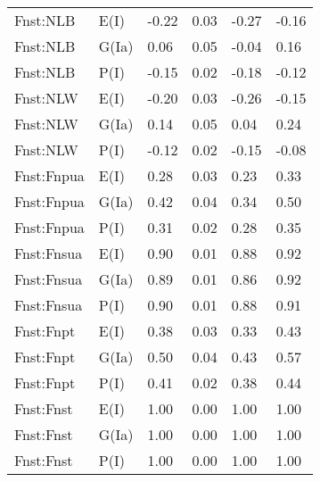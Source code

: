\begin{center}
\begin{longtable}{|p{1.1in}|p{0.7in}|p{0.7in}|p{0.6in}|p{0.6in}|p{0.6in}|}
  Fnst:NLB & E(I) & -0.22 & 0.03 & -0.27 & -0.16 \\ 
  Fnst:NLB & G(Ia) & 0.06 & 0.05 & -0.04 & 0.16 \\ 
  Fnst:NLB & P(I) & -0.15 & 0.02 & -0.18 & -0.12 \\ 
  Fnst:NLW & E(I) & -0.20 & 0.03 & -0.26 & -0.15 \\ 
  Fnst:NLW & G(Ia) & 0.14 & 0.05 & 0.04 & 0.24 \\ 
  Fnst:NLW & P(I) & -0.12 & 0.02 & -0.15 & -0.08 \\ 
  Fnst:Fnpua & E(I) & 0.28 & 0.03 & 0.23 & 0.33 \\ 
  Fnst:Fnpua & G(Ia) & 0.42 & 0.04 & 0.34 & 0.50 \\ 
  Fnst:Fnpua & P(I) & 0.31 & 0.02 & 0.28 & 0.35 \\ 
  Fnst:Fnsua & E(I) & 0.90 & 0.01 & 0.88 & 0.92 \\ 
  Fnst:Fnsua & G(Ia) & 0.89 & 0.01 & 0.86 & 0.92 \\ 
  Fnst:Fnsua & P(I) & 0.90 & 0.01 & 0.88 & 0.91 \\ 
  Fnst:Fnpt & E(I) & 0.38 & 0.03 & 0.33 & 0.43 \\ 
  Fnst:Fnpt & G(Ia) & 0.50 & 0.04 & 0.43 & 0.57 \\ 
  Fnst:Fnpt & P(I) & 0.41 & 0.02 & 0.38 & 0.44 \\ 
  Fnst:Fnst & E(I) & 1.00 & 0.00 & 1.00 & 1.00 \\ 
  Fnst:Fnst & G(Ia) & 1.00 & 0.00 & 1.00 & 1.00 \\ 
  Fnst:Fnst & P(I) & 1.00 & 0.00 & 1.00 & 1.00 \\ 
   \hline
\end{longtable}
\end{center}
%
